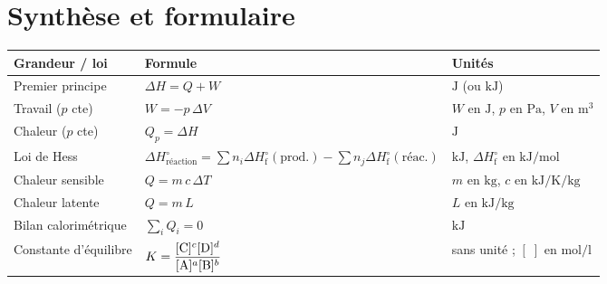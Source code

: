 \documentclass[11pt,a4paper]{article}
\newcommand{\dH}{\Delta H}
\newcommand{\dHr}{\Delta H^{\circ}_{\text{réaction}}}
\newcommand{\dHf}{\Delta H^{\circ}_{\text{f}}}
\begin{document}
\section{Synthèse et formulaire}

\begin{tcolorbox}[boxbase,colback=primary!4,colframe=primary,
   title={\textsc{Formulaire essentiel de la fiche 8}}]
\renewcommand{\arraystretch}{1.6}
\begin{center}
\begin{tabular}{>{\raggedright\arraybackslash}m{5.2cm} >{\centering\arraybackslash}m{4.6cm} >{\raggedright\arraybackslash}m{4.6cm}}
\textbf{Grandeur / loi} & \textbf{Formule} & \textbf{Unités}\\
\hline
Premier principe & $\dH = Q + W$ & $\si{\joule}$ (ou $\si{\kilo\joule}$)\\
Travail ($p$ cte) & $W = -p\,\Delta V$ & $W$ en $\si{\joule}$, $p$ en $\si{\pascal}$, $V$ en $\si{\cubic\metre}$\\
Chaleur ($p$ cte) & $Q_p = \dH$ & $\si{\joule}$\\
Loi de Hess & $\dHr = \sum n_i\dHf(\text{prod.}) - \sum n_j\dHf(\text{réac.})$ & $\si{\kilo\joule}$, $\dHf$ en $\si{\kilo\joule\per\mol}$\\
Chaleur sensible & $Q = m\,c\,\Delta T$ & $m$ en $\si{\kilogram}$, $c$ en $\si{\kilo\joule\per\kelvin\per\kilogram}$\\
Chaleur latente & $Q = m\,L$ & $L$ en $\si{\kilo\joule\per\kilogram}$\\
Bilan calorimétrique & $\sum_i Q_i = 0$ & $\si{\kilo\joule}$\\
Constante d'équilibre & $K = \dfrac{[\ce{C}]^c[\ce{D}]^d}{[\ce{A}]^a[\ce{B}]^b}$ & sans unité ; $[\;]$ en $\si{\mol\per\litre}$\\
\end{tabular}
\end{center}
\renewcommand{\arraystretch}{1.0}
\end{tcolorbox}
\end{document}
